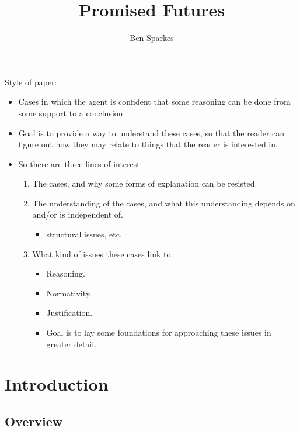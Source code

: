 \documentclass[10pt]{article}
\title{Promised Futures}
\author{Ben Sparkes}
\begin{document}
\maketitle

\tableofcontents

\newpage

\begin{note}
  Style of paper:
  \begin{itemize}
  \item Cases in which the agent is confident that some reasoning can be done from some support to a conclusion.
  \item Goal is to provide a way to understand these cases, so that the reader can figure out how they may relate to things that the reader is interested in.
  \item So there are three lines of interest
    \begin{enumerate}
    \item The cases, and why some forms of explanation can be resisted.
    \item The understanding of the cases, and what this understanding depends on and/or is independent of.
      \begin{itemize}
      \item structural issues, etc.\
      \end{itemize}
    \item What kind of issues these cases link to.
      \begin{itemize}
      \item Reasoning.
      \item Normativity.
      \item Justification.
      \item Goal is to lay some foundations for approaching these issues in greater detail.
      \end{itemize}
    \end{enumerate}
  \end{itemize}
\end{note}



\section{Introduction}
\label{sec:introduction}

\subsection{Overview}
\label{sec:overview}
\end{document}
